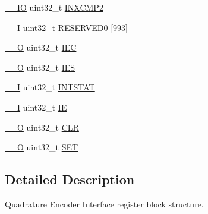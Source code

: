 \begin{DoxyCompactItemize}
\item 
\hyperlink{core__cm3_8h_aec43007d9998a0a0e01faede4133d6be}{\-\_\-\-\_\-\-I\-O} uint32\-\_\-t \hyperlink{structLPC__QEI__T_a19ba8a85129824ec0259b6733baff660}{I\-N\-X\-C\-M\-P2}
\item 
\hyperlink{core__cm3_8h_af63697ed9952cc71e1225efe205f6cd3}{\-\_\-\-\_\-\-I} uint32\-\_\-t \hyperlink{structLPC__QEI__T_a4989c1bc50afbce2d2b4e966d2c518a5}{R\-E\-S\-E\-R\-V\-E\-D0} \mbox{[}993\mbox{]}
\item 
\hyperlink{core__cm3_8h_a7e25d9380f9ef903923964322e71f2f6}{\-\_\-\-\_\-\-O} uint32\-\_\-t \hyperlink{structLPC__QEI__T_ad4164e0990c509994c19caccf1f7cf61}{I\-E\-C}
\item 
\hyperlink{core__cm3_8h_a7e25d9380f9ef903923964322e71f2f6}{\-\_\-\-\_\-\-O} uint32\-\_\-t \hyperlink{structLPC__QEI__T_a2eab592cbea507455a7aaab9a5ab6d53}{I\-E\-S}
\item 
\hyperlink{core__cm3_8h_af63697ed9952cc71e1225efe205f6cd3}{\-\_\-\-\_\-\-I} uint32\-\_\-t \hyperlink{structLPC__QEI__T_a550a4e26c5e38589e8722dc3064478a5}{I\-N\-T\-S\-T\-A\-T}
\item 
\hyperlink{core__cm3_8h_af63697ed9952cc71e1225efe205f6cd3}{\-\_\-\-\_\-\-I} uint32\-\_\-t \hyperlink{structLPC__QEI__T_a89eace37d24d618b12322f0479b3aefd}{I\-E}
\item 
\hyperlink{core__cm3_8h_a7e25d9380f9ef903923964322e71f2f6}{\-\_\-\-\_\-\-O} uint32\-\_\-t \hyperlink{structLPC__QEI__T_a909f2a48a6a21651d6baf9a3a94e6cb0}{C\-L\-R}
\item 
\hyperlink{core__cm3_8h_a7e25d9380f9ef903923964322e71f2f6}{\-\_\-\-\_\-\-O} uint32\-\_\-t \hyperlink{structLPC__QEI__T_a199af3383881188039525c15e18049a9}{S\-E\-T}
\end{DoxyCompactItemize}


\subsection{Detailed Description}
Quadrature Encoder Interface register block structure. 

